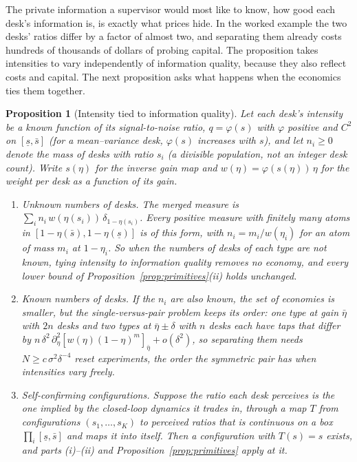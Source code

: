 \documentclass[12pt]{article}
\newtheorem{proposition}[theorem]{Proposition}
\theoremstyle{definition}
\theoremstyle{remark}
\begin{document}
The private information a supervisor would most like to know, how good each desk's information is, is exactly what prices hide. In the worked example the two desks' ratios differ by a factor of almost two, and separating them already costs hundreds of thousands of dollars of probing capital. The proposition takes intensities to vary independently of information quality, because they also reflect costs and capital. The next proposition asks what happens when the economics ties them together.

\begin{proposition}[Intensity tied to information quality]\label{prop:tied}
Let each desk's intensity be a known function of its signal-to-noise ratio, $q=\varphi(s)$ with $\varphi$ positive and $C^2$ on $[\underline s,\bar s]$ (for a mean--variance desk, $\varphi(s)$ increases with $s$), and let $n_i\ge0$ denote the mass of desks with ratio $s_i$ (a divisible population, not an integer desk count). Write $s(\eta)$ for the inverse gain map and $w(\eta)=\varphi(s(\eta))\,\eta$ for the weight per desk as a function of its gain.
\begin{enumerate}[label=(\roman*)]
\item \emph{Unknown numbers of desks.} The merged measure is $\sum_in_i\,w(\eta(s_i))\,\delta_{1-\eta(s_i)}$. Every positive measure with finitely many atoms in $[1-\eta(\bar s),1-\eta(\underline s)]$ is of this form, with $n_i=m_i/w(\eta_i)$ for an atom of mass $m_i$ at $1-\eta_i$. So when the numbers of desks of each type are not known, tying intensity to information quality removes no economy, and every lower bound of Proposition~\ref{prop:primitives}(ii) holds unchanged.
\item \emph{Known numbers of desks.} If the $n_i$ are also known, the set of economies is smaller, but the single-versus-pair problem keeps its order: one type at gain $\bar\eta$ with $2n$ desks and two types at $\bar\eta\pm\delta$ with $n$ desks each have taps that differ by $n\,\delta^2\,\partial_\eta^2[w(\eta)(1-\eta)^m]_{\bar\eta}+o(\delta^2)$, so separating them needs $N\ge c\,\sigma^2\delta^{-4}$ reset experiments, the order the symmetric pair has when intensities vary freely.
\item \emph{Self-confirming configurations.} Suppose the ratio each desk perceives is the one implied by the closed-loop dynamics it trades in, through a map $T$ from configurations $(s_1,\dots,s_K)$ to perceived ratios that is continuous on a box $\prod_i[\underline s,\bar s]$ and maps it into itself. Then a configuration with $T(s)=s$ exists, and parts (i)--(ii) and Proposition~\ref{prop:primitives} apply at it.
\end{enumerate}
\end{proposition}
\end{document}
